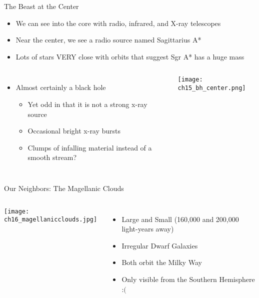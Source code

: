 \documentclass[pdf,aspectratio=169]{beamer}
\begin{document}
\begin{frame}{The Beast at the Center}
  \begin{itemize}
	\item We can see into the core with radio, infrared, and X-ray telescopes
	\item Near the center, we see a radio source named Sagittarius A*
	\item Lots of stars VERY close with orbits that suggest Sgr A* has a huge mass
  \end{itemize}
  \begin{columns}[t]
	\begin{itemize}
	  \item Almost certainly a black hole
		\begin{itemize}
		  \item Yet odd in that it is not a strong x-ray source
		  \item Occasional bright x-ray bursts
		  \item Clumps of infalling material instead of a smooth stream?
		\end{itemize}
	\end{itemize}
	\begin{center}
	  \texttt{[image: ch15\_bh\_center.png]}
	\end{center}
  \end{columns}
\end{frame}



\begin{frame}{Our Neighbors: The Magellanic Clouds}
  \begin{columns}
	\begin{center}
	  \texttt{[image: ch16\_magellanicclouds.jpg]}
	\end{center}
	\begin{itemize}
	  \item Large and Small (160,000 and 200,000 light-years away)
	  \item Irregular Dwarf Galaxies
	  \item Both orbit the Milky Way
	  \item Only visible from the Southern Hemisphere :$($
	\end{itemize}
  \end{columns}
\end{frame}
\end{document}
